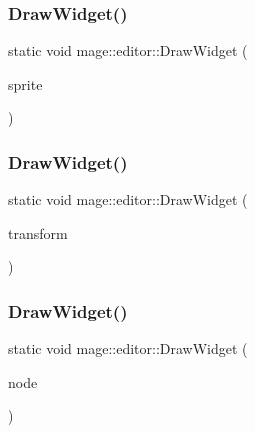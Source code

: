 \hypertarget{namespacemage_1_1editor_a64511af584a39f949d3c5a548adde050}{}\label{namespacemage_1_1editor_a64511af584a39f949d3c5a548adde050} 
\subsubsection{\texorpdfstring{Draw\+Widget()}{DrawWidget()}\hspace{0.1cm}{\footnotesize\ttfamily [18/20]}}
{\footnotesize\ttfamily static void mage\+::editor\+::\+Draw\+Widget (\begin{DoxyParamCaption}\item[{\hyperlink{classmage_1_1_sprite_text}{Sprite\+Text} \&}]{sprite }\end{DoxyParamCaption})\hspace{0.3cm}{\ttfamily [static]}}

\hypertarget{namespacemage_1_1editor_a522fbfe5aa8ada8eb3ebf0c40e02ef1d}{}\label{namespacemage_1_1editor_a522fbfe5aa8ada8eb3ebf0c40e02ef1d} 
\subsubsection{\texorpdfstring{Draw\+Widget()}{DrawWidget()}\hspace{0.1cm}{\footnotesize\ttfamily [19/20]}}
{\footnotesize\ttfamily static void mage\+::editor\+::\+Draw\+Widget (\begin{DoxyParamCaption}\item[{\hyperlink{classmage_1_1_transform}{Transform} \&}]{transform }\end{DoxyParamCaption})\hspace{0.3cm}{\ttfamily [static]}}

\hypertarget{namespacemage_1_1editor_a5687225a5c6ea498168c394df0d50410}{}\label{namespacemage_1_1editor_a5687225a5c6ea498168c394df0d50410} 
\subsubsection{\texorpdfstring{Draw\+Widget()}{DrawWidget()}\hspace{0.1cm}{\footnotesize\ttfamily [20/20]}}
{\footnotesize\ttfamily static void mage\+::editor\+::\+Draw\+Widget (\begin{DoxyParamCaption}\item[{\hyperlink{classmage_1_1_node}{Node} \&}]{node }\end{DoxyParamCaption})\hspace{0.3cm}{\ttfamily [static]}}

